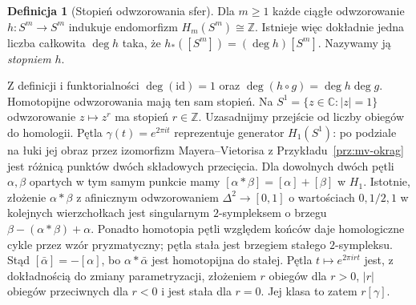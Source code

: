 \documentclass[11pt,a4paper,oneside]{report}
\newcommand{\C}{\mathbb{C}}
\newcommand{\Z}{\mathbb{Z}}
\newcommand{\id}{\mathrm{id}}
\theoremstyle{plain}
\theoremstyle{definition}
\newtheorem{definicja}[twierdzenie]{Definicja}
\theoremstyle{remark}
\begin{document}
\begin{definicja}[Stopień odwzorowania sfer]
\label{def:stopien-sfer}
Dla $m\geq1$ każde ciągłe odwzorowanie
$h:S^m\to S^m$ indukuje
endomorfizm $H_m(S^m)\cong\Z$.
Istnieje więc dokładnie jedna
liczba całkowita $\deg h$ taka,
że $h_*([S^m])=(\deg h)[S^m]$.
Nazywamy ją \emph{stopniem} $h$.
\end{definicja}

Z definicji i funktorialności
$\deg(\id)=1$ oraz
$\deg(h\circ g)=\deg h\deg g$.
Homotopijne odwzorowania mają ten sam
stopień. Na $S^1=\{z\in\C:|z|=1\}$
odwzorowanie $z\mapsto z^r$ ma stopień $r\in\Z$.
Uzasadnijmy przejście od liczby obiegów do homologii.
Pętla $\gamma(t)=e^{2\pi it}$ reprezentuje generator $H_1(S^1)$:
po podziale na łuki jej obraz przez izomorfizm Mayera--Vietorisa
z Przykładu~\ref{prz:mv-okrag} jest różnicą punktów dwóch składowych przecięcia.
Dla dowolnych dwóch pętli $\alpha,\beta$ opartych w tym samym punkcie
mamy $[\alpha*\beta]=[\alpha]+[\beta]$ w $H_1$.
Istotnie, złożenie $\alpha*\beta$ z afinicznym odwzorowaniem
$\Delta^2\to[0,1]$ o wartościach $0,1/2,1$ w kolejnych wierzchołkach
jest singularnym $2$-sympleksem o brzegu
$\beta-(\alpha*\beta)+\alpha$.
Ponadto homotopia pętli względem końców daje homologiczne cykle
przez wzór pryzmatyczny; pętla stała jest brzegiem stałego $2$-sympleksu.
Stąd $[\bar\alpha]=-[\alpha]$, bo $\alpha*\bar\alpha$ jest
homotopijna do stałej. Pętla $t\mapsto e^{2\pi irt}$ jest,
z dokładnością do zmiany parametryzacji, złożeniem $r$ obiegów dla $r>0$,
$|r|$ obiegów przeciwnych dla $r<0$
i jest stała dla $r=0$. Jej klasa to zatem $r[\gamma]$.
\end{document}
